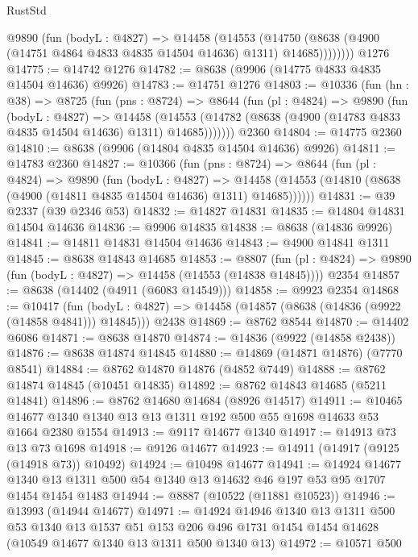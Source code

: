 \begin{lexlean}{RustStd}
\begin{coremodule}
          @9890
            (fun (bodyL : @4827) =>
            @14458
              (@14553
                (@14750 (@8638 (@4900 (@14751 @4864 @4833 @4835 @14504 @14636) @1311) @14685))))))))
    @1276
@14775 := @14742 @1276
@14782 := @8638 (@9906 (@14775 @4833 @4835 @14504 @14636) @9926)
@14783 := @14751 @1276
@14803 := @10336
    (fun (hn : @38) =>
    @8725
      (fun (pns : @8724) =>
      @8644
        (fun (pl : @4824) =>
        @9890
          (fun (bodyL : @4827) =>
          @14458
            (@14553 (@14782 (@8638 (@4900 (@14783 @4833 @4835 @14504 @14636) @1311) @14685)))))))
    @2360
@14804 := @14775 @2360
@14810 := @8638 (@9906 (@14804 @4835 @14504 @14636) @9926)
@14811 := @14783 @2360
@14827 := @10366
    (fun (pns : @8724) =>
    @8644
      (fun (pl : @4824) =>
      @9890
        (fun (bodyL : @4827) =>
        @14458 (@14553 (@14810 (@8638 (@4900 (@14811 @4835 @14504 @14636) @1311) @14685))))))
@14831 := @39 @2337 (@39 @2346 @53)
@14832 := @14827 @14831
@14835 := @14804 @14831 @14504 @14636
@14836 := @9906 @14835
@14838 := @8638 (@14836 @9926)
@14841 := @14811 @14831 @14504 @14636
@14843 := @4900 @14841 @1311
@14845 := @8638 @14843 @14685
@14853 := @8807
    (fun (pl : @4824) => @9890 (fun (bodyL : @4827) => @14458 (@14553 (@14838 @14845))))
    @2354
@14857 := @8638 (@14402 (@4911 (@6083 @14549)))
@14858 := @9923 @2354
@14868 := @10417
    (fun (bodyL : @4827) => @14458 (@14857 (@8638 (@14836 (@9922 (@14858 @4841))) @14845)))
    @2438
@14869 := @8762 @8544
@14870 := @14402 @6086
@14871 := @8638 @14870
@14874 := @14836 (@9922 (@14858 @2438))
@14876 := @8638 @14874 @14845
@14880 := @14869 (@14871 @14876) (@7770 @8541)
@14884 := @8762 @14870 @14876 (@4852 @7449)
@14888 := @8762 @14874 @14845 (@10451 @14835)
@14892 := @8762 @14843 @14685 (@5211 @14841)
@14896 := @8762 @14680 @14684 (@8926 @14517)
@14911 := @10465 @14677 @1340 @1340 @13 @13 @1311 @192 @500 @55 @1698 @14633 @53 @1664 @2380 @1554
@14913 := @9117 @14677 @1340
@14917 := @14913 @73 @13 @73 @1698
@14918 := @9126 @14677
@14923 := @14911 (@14917 (@9125 (@14918 @73)) @10492)
@14924 := @10498 @14677
@14941 := @14924
    @14677
    @1340
    @13
    @1311
    @500
    @54
    @1340
    @13
    @14632
    @46
    @197
    @53
    @95
    @1707
    @1454
    @1454
    @1483
@14944 := @8887 (@10522 (@11881 @10523))
@14946 := @13993 (@14944 @14677)
@14971 := @14924
    @14946
    @1340
    @13
    @1311
    @500
    @53
    @1340
    @13
    @1537
    @51
    @153
    @206
    @496
    @1731
    @1454
    @1454
    @14628
    (@10549 @14677 @1340 @13 @1311 @500 @1340 @13)
@14972 := @10571 @500

\end{coremodule}
\end{lexlean}
